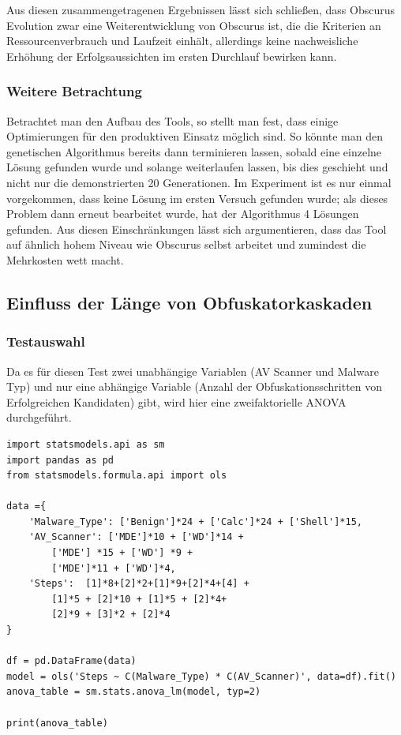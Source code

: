 Aus diesen zusammengetragenen Ergebnissen lässt sich schließen, dass Obscurus Evolution zwar eine Weiterentwicklung von Obscurus ist, die die Kriterien an Ressourcenverbrauch und Laufzeit einhält, allerdings keine nachweisliche Erhöhung der Erfolgsaussichten im ersten Durchlauf bewirken kann.

\subsubsection{Weitere Betrachtung}
Betrachtet man den Aufbau des Tools, so stellt man fest, dass einige Optimierungen für den produktiven Einsatz möglich sind. So könnte man den genetischen Algorithmus bereits dann terminieren lassen, sobald eine einzelne Lösung gefunden wurde und solange weiterlaufen lassen, bis dies geschieht und nicht nur die demonstrierten 20 Generationen. Im Experiment ist es nur einmal vorgekommen, dass keine Lösung im ersten Versuch gefunden wurde; als dieses Problem dann erneut bearbeitet wurde, hat der Algorithmus 4 Lösungen gefunden. Aus diesen Einschränkungen lässt sich argumentieren, dass das Tool auf ähnlich hohem Niveau wie Obscurus selbst arbeitet und zumindest die Mehrkosten wett macht.


\subsection{Einfluss der Länge von Obfuskatorkaskaden}

 \subsubsection{Testauswahl}
 Da es für diesen Test zwei unabhängige Variablen (AV Scanner und Malware Typ) und nur eine abhängige Variable (Anzahl der Obfuskationsschritten von Erfolgreichen Kandidaten) gibt, wird hier eine zweifaktorielle ANOVA durchgeführt.

\begin{listing}
    \begin{verbatim}
import statsmodels.api as sm
import pandas as pd
from statsmodels.formula.api import ols

data ={
    'Malware_Type': ['Benign']*24 + ['Calc']*24 + ['Shell']*15,
    'AV_Scanner': ['MDE']*10 + ['WD']*14 + 
        ['MDE'] *15 + ['WD'] *9 + 
        ['MDE']*11 + ['WD']*4,
    'Steps':  [1]*8+[2]*2+[1]*9+[2]*4+[4] + 
        [1]*5 + [2]*10 + [1]*5 + [2]*4+ 
        [2]*9 + [3]*2 + [2]*4
} 

df = pd.DataFrame(data)
model = ols('Steps ~ C(Malware_Type) * C(AV_Scanner)', data=df).fit()
anova_table = sm.stats.anova_lm(model, typ=2)

print(anova_table)
    \end{verbatim}
\end{listing}

